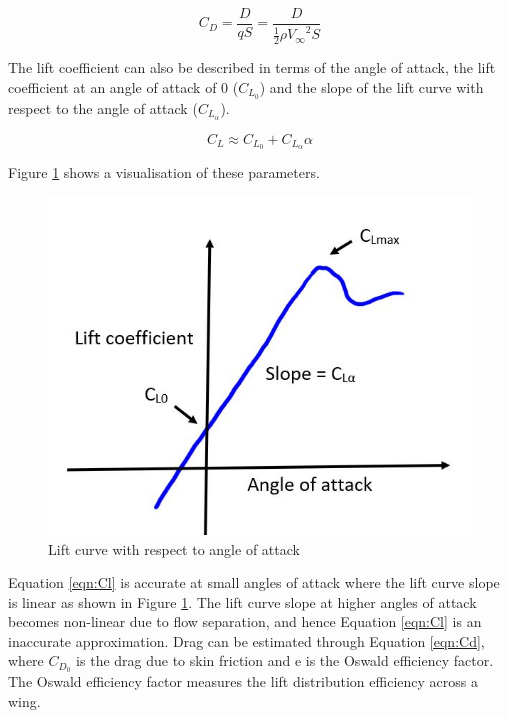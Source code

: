 \begin{equation}
     C_D = \frac{D}{qS} = \frac{D}{\frac{1}{2}\rho {V_\infty}^2 S}
     \label{eqn:drag}
\end{equation}

The lift coefficient can also be described in terms of the angle of attack, the lift coefficient at an angle of attack of 0 ($C_{L_0}$) and the slope of the lift curve with respect to the angle of attack ($C_{L_\alpha}$). 

\begin{equation}
    C_L \approx C_{L_0} + C_{L_\alpha}\alpha
    \label{eqn:Cl}
\end{equation}

Figure \ref{fig:Clalpha} shows a visualisation of these parameters. 

\begin{figure}[H]
    \centering
    \includegraphics[scale = 0.6]{02_Background/Figs/liftcurveslope.JPG}
    \caption{Lift curve with respect to angle of attack}
    \label{fig:Clalpha}
\end{figure}

Equation \ref{eqn:Cl} is accurate at small angles of attack where the lift curve slope is linear as shown in Figure \ref{fig:Clalpha}. The lift curve slope at higher angles of attack becomes non-linear due to flow separation, and hence Equation \ref{eqn:Cl} is an inaccurate approximation. Drag can be estimated through Equation \ref{eqn:Cd}, where $C_{D_0}$ is the drag due to skin friction and e is the Oswald efficiency factor. The Oswald efficiency factor measures the lift distribution efficiency across a wing. 


